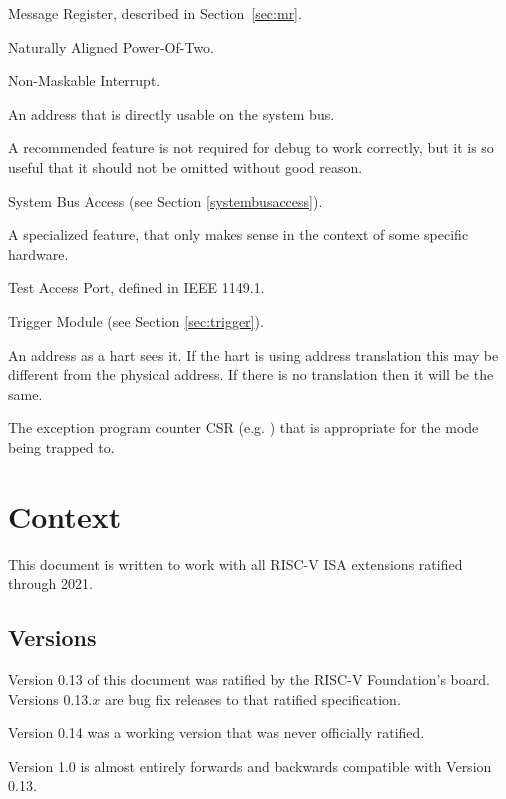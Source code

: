 \begin{description}[style=nextline]
    \item[MR]
        Message Register, described in Section~\ref{sec:mr}.
    \item[NAPOT]
        Naturally Aligned Power-Of-Two.
    \item[NMI]
        Non-Maskable Interrupt.
    \item[physical address]
        An address that is directly usable on the system bus.
    \item[recommended feature]
        A recommended feature is not required for debug to work correctly, but
        it is so useful that it should not be omitted without good reason.
    \item[SBA]
        System Bus Access (see Section \ref{systembusaccess}).
    \item[specialized feature]
        A specialized feature, that only makes sense in the context of some
        specific hardware.
    \item[TAP]
        Test Access Port, defined in IEEE 1149.1.
    \item[TM]
        Trigger Module (see Section \ref{sec:trigger}).
    \item[virtual address]
        An address as a hart sees it. If the hart is using address translation this
        may be different from the physical address. If there is no
        translation then it will be the same.
    \item[\Rxepc]
        The exception program counter CSR (e.g. \Rmepc) that is appropriate for
        the mode being trapped to.
\end{description}

\section{Context}

This document is written to work with all RISC-V ISA extensions ratified
through 2021.

\subsection{Versions}

Version 0.13 of this document was ratified by the RISC-V Foundation's board.
Versions 0.13.$x$ are bug fix releases to that ratified specification.

Version 0.14 was a working version that was never officially ratified.

Version 1.0 is almost entirely forwards and backwards compatible with Version 0.13.

